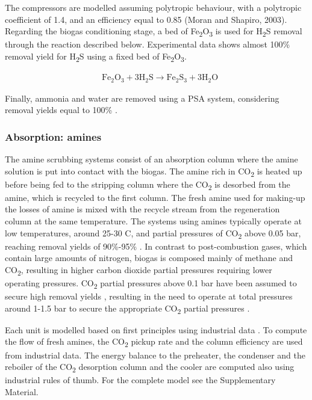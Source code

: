 \begin{refsection}[referencesCh7]
The compressors are modelled assuming polytropic behaviour, with a polytropic coefficient of 1.4, and an efficiency equal to 0.85 (Moran and Shapiro, 2003). Regarding the biogas conditioning stage, a bed of Fe\textsubscript{2}O\textsubscript{3} is used for H\textsubscript{2}S removal through the reaction described below. Experimental data shows almost 100\% removal yield for H\textsubscript{2}S using a fixed bed of Fe\textsubscript{2}O\textsubscript{3}.

\begin{align}
& \text{Fe}_{2}\text{O}_{3} + 3\text{H}_2 \text{S} \rightarrow \text{Fe}_{2}\text{S}_{3} + 3\text{H}_2 \text{O}
\end{align}

Finally, ammonia and water are removed using a PSA system, considering removal yields equal to 100\% \citep{Nexant2006, 2004gpsa}.

\subsubsection{Absorption: amines} \label{section:MathModAbsorptionAmines}
The amine scrubbing systems consist of an absorption column where the amine solution is put into contact with the biogas. The amine rich in CO\textsubscript{2} is heated up before being fed to the stripping column where the CO\textsubscript{2} is desorbed from the amine, which is recycled to the first column. The fresh amine used for making-up the losses of amine is mixed with the recycle stream from the regeneration column at the same temperature. The systems using amines typically operate at low temperatures, around 25-30 \textdegree C, and partial pressures of CO\textsubscript{2} above 0.05 bar, reaching removal yields of 90\%-95\% \citep{zhang2013modeling}. In contrast to post-combustion gases, which contain large amounts of nitrogen, biogas is composed
mainly of methane and CO\textsubscript{2}, resulting in higher carbon dioxide partial pressures requiring lower operating pressures. CO\textsubscript{2} partial pressures above 0.1 bar have been assumed to secure high removal yields \citep{zhang2013modeling}, resulting in the need to operate at total pressures around 1-1.5 bar to secure the appropriate CO\textsubscript{2} partial pressures \citep{movagharnejad2011simulation, xue2017comparative}.

Each unit is modelled based on first principles using industrial data \citep{2012gpsa}. To compute the flow of fresh amines, the CO\textsubscript{2} pickup rate and the column efficiency are used from industrial data. The energy balance to the preheater, the condenser and the reboiler of the CO\textsubscript{2} desorption column and the cooler are computed also using industrial rules of thumb. For the complete model see the Supplementary Material.


\end{refsection}
